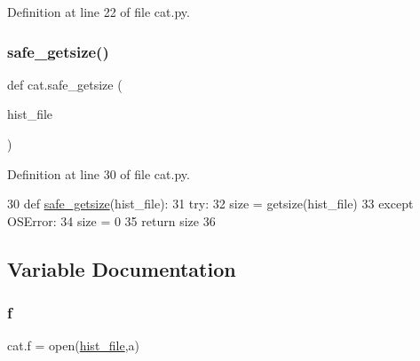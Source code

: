 Definition at line 22 of file cat.\+py.


\mbox{\label{namespacecat_abd324a9da9ba2b9c5ae75515174616cd}} 
\subsubsection{\texorpdfstring{safe\+\_\+getsize()}{safe\_getsize()}}
{\footnotesize\ttfamily def cat.\+safe\+\_\+getsize (\begin{DoxyParamCaption}\item[{}]{hist\+\_\+file }\end{DoxyParamCaption})}



Definition at line 30 of file cat.\+py.


\begin{DoxyCode}
30 \textcolor{keyword}{def }\hyperlink{namespacecat_abd324a9da9ba2b9c5ae75515174616cd}{safe\_getsize}(hist\_file):
31         \textcolor{keywordflow}{try}:
32                 size = getsize(hist\_file)
33         \textcolor{keywordflow}{except} OSError:
34                 size = 0
35         \textcolor{keywordflow}{return} size
36 
\end{DoxyCode}


\subsection{Variable Documentation}
\mbox{\label{namespacecat_ac4e5e84140346d3c05a72261c63ef7b1}} 
\subsubsection{\texorpdfstring{f}{f}}
{\footnotesize\ttfamily cat.\+f = open(\hyperlink{namespacecat_a5be1540f4d9418c1650b9bafbe8efa5a}{hist\+\_\+file},\textquotesingle{}a\textquotesingle{})}



